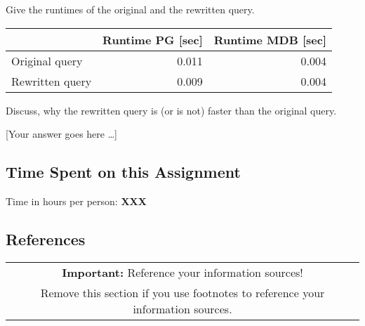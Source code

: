 \documentclass[11pt]{scrartcl}
\newcommand{\youranswerhere}{[Your answer goes here \ldots]}
\begin{document}
    Give the runtimes of the original and the rewritten query.

    \begin{table}[H]
        \centering
        \begin{tabular}{l|r|r}
            & Runtime PG [sec] & Runtime MDB [sec] \tabularnewline
            \hline
            Original query & 0.011 & 0.004 \tabularnewline
            Rewritten query & 0.009 & 0.004 \tabularnewline
        \end{tabular}
    \end{table}

    Discuss, why the rewritten query is (or is not) faster than the original query.

    \youranswerhere{}

    \subsection*{Time Spent on this Assignment}

    Time in hours per person: \textbf{XXX}

    \subsection*{References}

    \begin{table}[H]
        \centering
        \begin{tabular}{c}
            \hline
            \textbf{Important:} Reference your information sources! \tabularnewline
            Remove this section if you use footnotes to reference your information sources. \tabularnewline
            \hline
        \end{tabular}
    \end{table}
\end{document}
